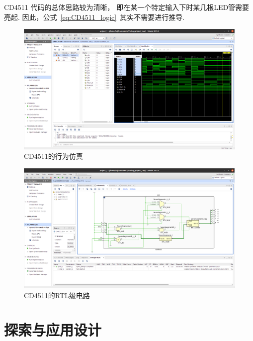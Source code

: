 \documentclass[11pt]{SEU-Digital-Report}
\begin{document}
                \begin{analyze}{}{}
                    CD4511 代码的总体思路较为清晰，
                    即在某一个特定输入下时某几根LED管需要亮起.
                    因此，公式~\eqref{eq:CD4511_logic}~其实不需要进行推导.
                \end{analyze}

                \begin{figure}[htbp]
                    \includegraphics[width=\linewidth]{fig/vivado/3_simu.png}
                    \caption{CD4511的行为仿真}
                    \label{fig:vivado_3_simu}
                \end{figure}
    
                \begin{figure}[htbp]
                    \includegraphics[width=\linewidth]{fig/vivado/3_RTL.png}
                    \caption{CD4511的RTL级电路}
                    \label{fig:vivado_3_RTL}
                \end{figure}
     
            \newpage
            \section{探索与应用设计}
\end{document}
